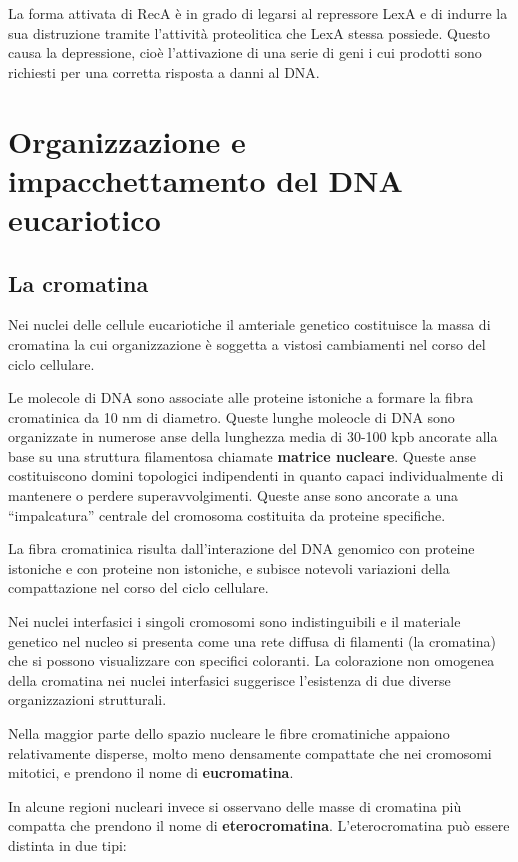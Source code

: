 \documentclass[11pt]{book}
\begin{document}
La forma attivata di RecA è in grado di legarsi al repressore LexA e di
indurre la sua distruzione tramite l'attività proteolitica che LexA
stessa possiede. Questo causa la depressione, cioè l'attivazione di una
serie di geni i cui prodotti sono richiesti per una corretta risposta a
danni al DNA.

\chapter{Organizzazione e impacchettamento del DNA
eucariotico}\label{organizzazione-e-impacchettamento-del-dna-eucariotico}

\section{La cromatina}\label{la-cromatina}

Nei nuclei delle cellule eucariotiche il amteriale genetico costituisce
la massa di cromatina la cui organizzazione è soggetta a vistosi
cambiamenti nel corso del ciclo cellulare.

Le molecole di DNA sono associate alle proteine istoniche a formare la
fibra cromatinica da 10 nm di diametro. Queste lunghe moleocle di DNA
sono organizzate in numerose anse della lunghezza media di 30-100 kpb
ancorate alla base su una struttura filamentosa chiamate \textbf{matrice
nucleare}. Queste anse costituiscono domini topologici indipendenti in
quanto capaci individualmente di mantenere o perdere superavvolgimenti.
Queste anse sono ancorate a una ``impalcatura'' centrale del cromosoma
costituita da proteine specifiche.

La fibra cromatinica risulta dall'interazione del DNA genomico con
proteine istoniche e con proteine non istoniche, e subisce notevoli
variazioni della compattazione nel corso del ciclo cellulare.

Nei nuclei interfasici i singoli cromosomi sono indistinguibili e il
materiale genetico nel nucleo si presenta come una rete diffusa di
filamenti (la cromatina) che si possono visualizzare con specifici
coloranti. La colorazione non omogenea della cromatina nei nuclei
interfasici suggerisce l'esistenza di due diverse organizzazioni
strutturali.

Nella maggior parte dello spazio nucleare le fibre cromatiniche appaiono
relativamente disperse, molto meno densamente compattate che nei
cromosomi mitotici, e prendono il nome di \textbf{eucromatina}.

In alcune regioni nucleari invece si osservano delle masse di cromatina
più compatta che prendono il nome di \textbf{eterocromatina}.
L'eterocromatina può essere distinta in due tipi:
\end{document}
